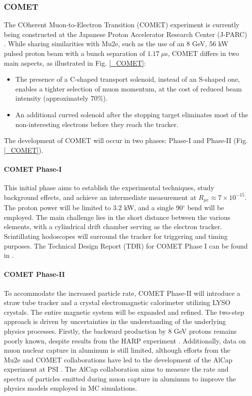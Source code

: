 \begin{refsection}
        \subsubsection{COMET}
        The COherent Muon-to-Electron Transition (COMET) experiment is currently being constructed at the Japanese Proton Accelerator Research Center (J-PARC) \cite{COMET_I}. 
While sharing similarities with Mu2e, such as the use of an 8 GeV, 56 kW pulsed proton beam with a bunch separation of $1.17\ \mu$s, COMET differs in two main aspects, as illustrated in Fig. \ref{_COMET}:
\begin{itemize}
    \item The presence of a C-shaped transport solenoid, instead of an S-shaped one, enables a tighter selection of muon momentum, at the cost of reduced beam intensity (approximately 70\%).
    \item An additional curved solenoid after the stopping target eliminates most of the non-interesting electrons before they reach the tracker.
\end{itemize}
The development of COMET will occur in two phases: Phase-I and Phase-II (Fig. \ref{_COMET}).
\paragraph{COMET Phase-I}
This initial phase aims to establish the experimental techniques, study background effects, and achieve an intermediate measurement at $R_{\mu e}\approx7\times10^{-15}$. The proton power will be limited to 3.2 kW, and a single 90$^\circ$ bend will be employed. The main challenge lies in the short distance between the various elements, with a cylindrical drift chamber serving as the electron tracker. Scintillating hodoscopes will surround the tracker for triggering and timing purposes. The Technical Design Report (TDR) for COMET Phase I can be found in \cite{COMET_I}.
\paragraph{COMET Phase-II}
To accommodate the increased particle rate, COMET Phase-II will introduce a straw tube tracker and a crystal electromagnetic calorimeter utilizing LYSO crystals. The entire magnetic system will be expanded and refined.
The two-step approach is driven by uncertainties in the understanding of the underlying physics processes. 
Firstly, the backward production by 8 GeV protons remains poorly known, despite results from the HARP experiment \cite{HARP}. 
Additionally, data on muon nuclear capture in aluminum is still limited, although efforts from the Mu2e and COMET collaborations have led to the development of the AlCap experiment at PSI \cite{Edmonds:2015}\cite{AlCap:2015}\cite{AlCap:2018}. 
The AlCap collaboration aims to measure the rate and spectra of particles emitted during muon capture in aluminum to improve the physics models employed in MC simulations.


\end{refsection}
